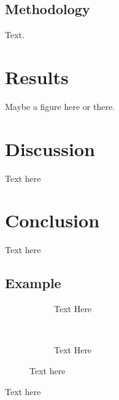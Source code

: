 \documentclass[a4paper, 12pt, english]{article}
\begin{document}
        \subsection{Methodology}
            \label{subsec: methodology}

            Text.
                



    \section{Results}
        \label{sec: results}

        Maybe a figure here or there.


    \section{Discussion}
        \label{sec: discussion}
        Text here


    \section{Conclusion}
        \label{sec: conclusion}

        Text here


    \newpage




    \newpage


    \appendices

        \subsection{Example}\label{app:example}
            \begin{figure}[!h]
                \begin{subfigure}[t]{0.45\textwidth}
                    \centering
                    \caption{Text Here}
                    \label{subfig: example1}
                \end{subfigure}
                ~
                \begin{subfigure}[t]{0.45\textwidth}
                    \centering
                    \caption{Text Here}
                    \label{subfig: example2}
                \end{subfigure}
                

                \caption{Text here}
                \label{fig: example}
            \end{figure}

            \FloatBarrier

            Text here

            
            
\end{document}

